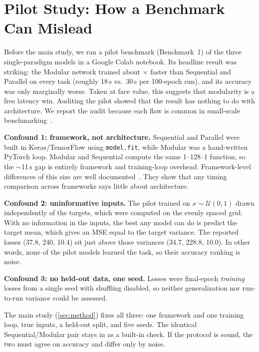 \section{Pilot Study: How a Benchmark Can Mislead}
\label{sec:pilot}

Before the main study, we ran a pilot benchmark (Benchmark~1) of the three single-paradigm models in a
Google Colab notebook. Its headline result was striking: the Modular network trained about
\pilotSpeedup$\times$ faster than Sequential and Parallel on every task (roughly 18\,s vs.\ 30\,s per 100-epoch run),
and its accuracy was only marginally worse. Taken at face value, this suggests that modularity is a free
latency win. Auditing the pilot showed that the result has nothing to do with architecture. We report the
audit because each flaw is common in small-scale benchmarking~\cite{lipton2019troubling,bouthillier2021accounting}.

\textbf{Confound 1: framework, not architecture.} Sequential and Parallel were built in
Keras/TensorFlow using \texttt{model.fit}, while Modular was a
hand-written PyTorch loop. Modular and Sequential compute the same 1--128--1 function, so the
$\sim$11\,s gap is entirely framework and training-loop overhead. Framework-level differences of this size
are well documented~\cite{shi2016benchmarking}. They show that any timing comparison across frameworks
says little about architecture.

\textbf{Confound 2: uninformative inputs.} The pilot trained on $x\sim\mathcal U(0,1)$ drawn
independently of the targets, which were computed on the evenly spaced grid. With no information in the
inputs, the best any model can do is predict the target mean, which gives an MSE equal to the target variance.
The reported losses (37.8, 240, 10.4) sit just above those variances (34.7, 228.8, 10.0). In other words,
none of the pilot models learned the task, so their accuracy ranking is noise.

\textbf{Confound 3: no held-out data, one seed.} Losses were final-epoch \emph{training} losses from a single
seed with shuffling disabled, so neither generalization nor run-to-run variance could be assessed.

The main study (\cref{sec:method}) fixes all three: one framework and one training loop, true inputs, a held-out
split, and five seeds. The identical Sequential/Modular pair stays in as a built-in check. If the protocol is
sound, the two must agree on accuracy and differ only by noise.
